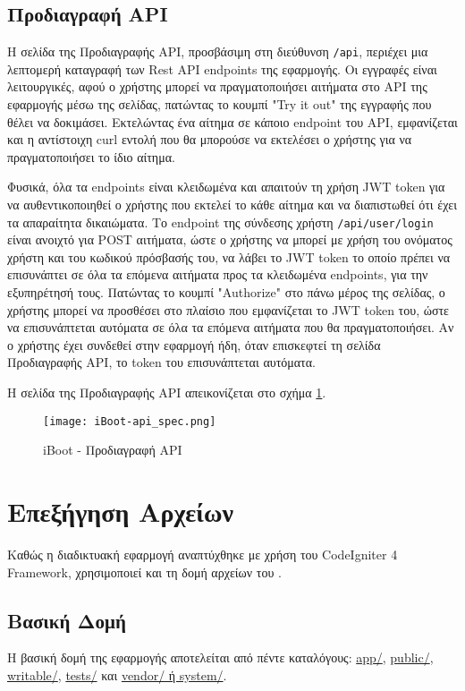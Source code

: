 \subsection{Προδιαγραφή API}
\FloatBarrier
Η σελίδα της Προδιαγραφής API, προσβάσιμη στη διεύθυνση \verb!/api!, περιέχει μια λεπτομερή καταγραφή των Rest API endpoints της εφαρμογής. Οι εγγραφές είναι λειτουργικές, αφού ο χρήστης μπορεί να πραγματοποιήσει αιτήματα στο API της εφαρμογής μέσω της σελίδας, πατώντας το κουμπί "Try it out" της εγγραφής που θέλει να δοκιμάσει. Εκτελώντας ένα αίτημα σε κάποιο endpoint του API, εμφανίζεται και η αντίστοιχη curl εντολή που θα μπορούσε να εκτελέσει ο χρήστης για να πραγματοποιήσει το ίδιο αίτημα.

Φυσικά, όλα τα endpoints είναι κλειδωμένα και απαιτούν τη χρήση JWT token για να αυθεντικοποιηθεί ο χρήστης που εκτελεί το κάθε αίτημα και να διαπιστωθεί ότι έχει τα απαραίτητα δικαιώματα. Το endpoint της σύνδεσης χρήστη \verb!/api/user/login! είναι ανοιχτό για POST αιτήματα, ώστε ο χρήστης να μπορεί με χρήση του ονόματος χρήστη και του κωδικού πρόσβασής του, να λάβει το JWT token το οποίο πρέπει να επισυνάπτει σε όλα τα επόμενα αιτήματα προς τα κλειδωμένα endpoints, για την εξυπηρέτησή τους. Πατώντας το κουμπί "Authorize" στο πάνω μέρος της σελίδας, ο χρήστης μπορεί να προσθέσει στο πλαίσιο που εμφανίζεται το JWT token του, ώστε να επισυνάπτεται αυτόματα σε όλα τα επόμενα αιτήματα που θα πραγματοποιήσει. Αν ο χρήστης έχει συνδεθεί στην εφαρμογή ήδη, όταν επισκεφτεί τη σελίδα Προδιαγραφής API, το token του επισυνάπτεται αυτόματα.

Η σελίδα της Προδιαγραφής API απεικονίζεται στο σχήμα \ref{fig:iBoot_api_spec}.
\begin{figure}[ht]
	\centering
	\texttt{[image: iBoot-api\_spec.png]}
	\caption{iBoot - Προδιαγραφή API}
	\label{fig:iBoot_api_spec}
\end{figure}
\FloatBarrier

\section{Επεξήγηση Αρχείων}
Καθώς η διαδικτυακή εφαρμογή αναπτύχθηκε με χρήση του CodeIgniter 4 Framework, χρησιμοποιεί και τη δομή αρχείων του \cite{CodeIgniter_structure}.

\subsection{Βασική Δομή}
Η βασική δομή της εφαρμογής αποτελείται από πέντε καταλόγους: \hyperref[ui:app]{app/}, \hyperref[ui:public]{public/}, \hyperref[ui:writable]{writable/}, \hyperref[ui:tests]{tests/} και \hyperref[ui:system]{vendor/ ή system/}.

